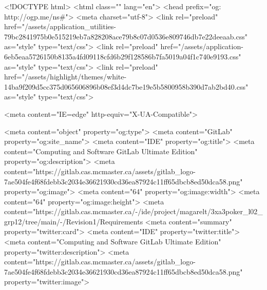 <!DOCTYPE html>
<html class="" lang="en">
<head prefix="og: http://ogp.me/ns#">
<meta charset="utf-8">
<link rel="preload" href="/assets/application_utilities-79bc2841975b0e515219eb7a828208ace79b8c07d0536e809746db7e22deeaab.css" as="style" type="text/css">
<link rel="preload" href="/assets/application-6eb5eaa5726150b8135a4fd09118cfd6b29f128586b7fa5019a04f1c740e9193.css" as="style" type="text/css">
<link rel="preload" href="/assets/highlight/themes/white-14ba9f209d5cc375d065606896b08ef3d4dc7be19e5b5800958b390d7ab2bd40.css" as="style" type="text/css">

<meta content="IE=edge" http-equiv="X-UA-Compatible">

<meta content="object" property="og:type">
<meta content="GitLab" property="og:site_name">
<meta content="IDE" property="og:title">
<meta content="Computing and Software GitLab Ultimate Edition" property="og:description">
<meta content="https://gitlab.cas.mcmaster.ca/assets/gitlab_logo-7ae504fe4f68fdebb3c2034e36621930cd36ea87924c11ff65dbcb8ed50dca58.png" property="og:image">
<meta content="64" property="og:image:width">
<meta content="64" property="og:image:height">
<meta content="https://gitlab.cas.mcmaster.ca/-/ide/project/magarelt/3xa3poker_l02_grp12/tree/main/-/Revision1/Requirements%
<meta content="summary" property="twitter:card">
<meta content="IDE" property="twitter:title">
<meta content="Computing and Software GitLab Ultimate Edition" property="twitter:description">
<meta content="https://gitlab.cas.mcmaster.ca/assets/gitlab_logo-7ae504fe4f68fdebb3c2034e36621930cd36ea87924c11ff65dbcb8ed50dca58.png" property="twitter:image">

